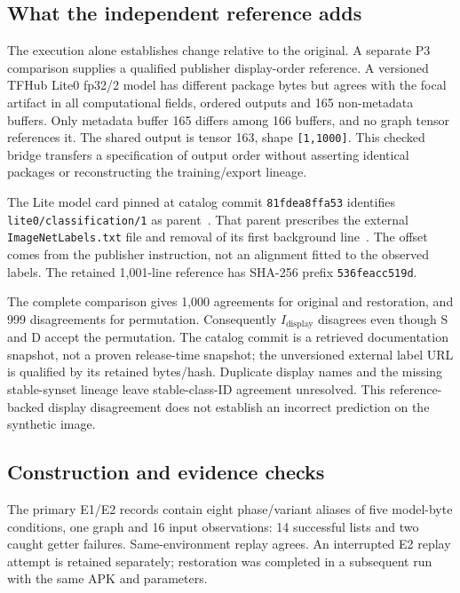 \documentclass[10pt,conference]{IEEEtran}
\newcommand{\code}[1]{\texttt{#1}}
\begin{document}
\subsection{What the independent reference adds}
\label{sec:p3}
The execution alone establishes change relative to the original. A separate P3 comparison supplies a qualified publisher display-order reference. A versioned TFHub Lite0 fp32/2 model has different package bytes but agrees with the focal artifact in all computational fields, ordered outputs and 165 non-metadata buffers. Only metadata buffer 165 differs among 166 buffers, and no graph tensor references it. The shared output is tensor 163, shape \code{[1,1000]}. This checked bridge transfers a specification of output order without asserting identical packages or reconstructing the training/export lineage.

The Lite model card pinned at catalog commit \code{81fdea8ffa53} identifies \code{lite0/classification/1} as parent~\cite{tfhub-lite-card}. That parent prescribes the external \code{ImageNetLabels.txt} file and removal of its first background line~\cite{tfhub-parent-card,imagenet-display}. The offset comes from the publisher instruction, not an alignment fitted to the observed labels. The retained 1,001-line reference has SHA-256 prefix \code{536feacc519d}.

The complete comparison gives 1,000 agreements for original and restoration, and 999 disagreements for permutation. Consequently $I_{\mathrm{display}}$ disagrees even though S and D accept the permutation. The catalog commit is a retrieved documentation snapshot, not a proven release-time snapshot; the unversioned external label URL is qualified by its retained bytes/hash. Duplicate display names and the missing stable-synset lineage leave stable-class-ID agreement unresolved. This reference-backed display disagreement does not establish an incorrect prediction on the synthetic image.

\subsection{Construction and evidence checks}
The primary E1/E2 records contain eight phase/variant aliases of five model-byte conditions, one graph and 16 input observations: 14 successful lists and two caught getter failures. Same-environment replay agrees. An interrupted E2 replay attempt is retained separately; restoration was completed in a subsequent run with the same APK and parameters.
\end{document}
